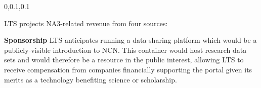 \begin{frame}{}
{\begin{minipage}{1.08\textwidth}
\begin{lightquadblockc}{0,0.1,0.1}{\parbox{21cm}{\centering \vspace{10pt}LTS projects NA3-related 
		revenue from four sources:\vspace{3pt}}}
\begin{center}
\begin{minipage}{\textwidth}
{\begin{enumerate}
\dmitem \textbf{Sponsorship}  \hspace{.5em} LTS anticipates 
running a data-sharing platform which would be a 
publicly-visible introduction to NCN.  
This  container 
would host research data sets and 
would therefore be a resource in the public 
interest, allowing LTS to receive compensation 
from companies financially supporting the 
portal given its merits as a technology 
benefiting science or scholarship.
\end{enumerate}
}\end{minipage}
\end{center}
\end{lightquadblockc}
\end{minipage}

}

\end{frame}
